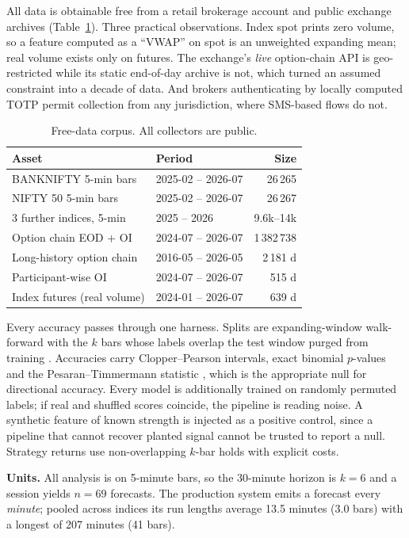 \documentclass[sigconf,nonacm]{acmart}
\begin{document}
All data is obtainable free from a retail brokerage account and public exchange
archives (Table~\ref{tab:data}). Three practical observations. Index spot prints
zero volume, so a feature computed as a ``VWAP'' on spot is an unweighted
expanding mean; real volume exists only on futures. The exchange's \emph{live}
option-chain API is geo-restricted while its static end-of-day archive is not,
which turned an assumed constraint into a decade of data. And brokers
authenticating by locally computed TOTP permit collection from any jurisdiction,
where SMS-based flows do not.

\begin{table}[t]
\caption{Free-data corpus. All collectors are public.}
\label{tab:data}
\small
\begin{tabular}{@{}llr@{}}
\toprule
\textbf{Asset} & \textbf{Period} & \textbf{Size} \\
\midrule
BANKNIFTY 5-min bars & 2025-02 -- 2026-07 & 26\,265 \\
NIFTY 50 5-min bars & 2025-02 -- 2026-07 & 26\,267 \\
3 further indices, 5-min & 2025 -- 2026 & 9.6k--14k \\
Option chain EOD + OI & 2024-07 -- 2026-07 & 1\,382\,738 \\
Long-history option chain & 2016-05 -- 2026-05 & 2\,181 d \\
Participant-wise OI & 2024-07 -- 2026-07 & 515 d \\
Index futures (real volume) & 2024-01 -- 2026-07 & 639 d \\
\bottomrule
\end{tabular}
\end{table}

Every accuracy passes through one harness. Splits are expanding-window
walk-forward with the $k$ bars whose labels overlap the test window purged from
training \cite{prado2018}. Accuracies carry Clopper--Pearson \cite{clopper1934}
intervals, exact binomial $p$-values and the Pesaran--Timmermann statistic
\cite{pt1992}, which is the appropriate null for directional accuracy. Every
model is additionally trained on randomly permuted labels; if real and shuffled
scores coincide, the pipeline is reading noise. A synthetic feature of known
strength is injected as a positive control, since a pipeline that cannot recover
planted signal cannot be trusted to report a null. Strategy returns use
non-overlapping $k$-bar holds with explicit costs.

\textbf{Units.} All analysis is on 5-minute bars, so the 30-minute horizon is
$k=6$ and a session yields $n=69$ forecasts. The production system emits a
forecast every \emph{minute}; pooled across indices its run lengths average 13.5
minutes (3.0 bars) with a longest of 207 minutes (41 bars).
\end{document}
